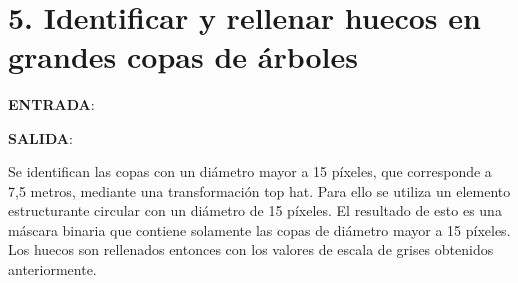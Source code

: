    \begin{center}
    \end{center}
    { \hspace*{\fill} \\}
    
    \hypertarget{identificar-y-rellenar-huecos-en-grandes-copas-de-uxe1rboles}{%
\section{5. Identificar y rellenar huecos en grandes copas de
árboles}\label{identificar-y-rellenar-huecos-en-grandes-copas-de-uxe1rboles}}

\textbf{ENTRADA}:

\textbf{SALIDA}:

Se identifican las copas con un diámetro mayor a 15 píxeles, que
corresponde a 7,5 metros, mediante una transformación top hat. Para ello
se utiliza un elemento estructurante circular con un diámetro de 15
píxeles. El resultado de esto es una máscara binaria que contiene
solamente las copas de diámetro mayor a 15 píxeles. Los huecos son
rellenados entonces con los valores de escala de grises obtenidos
anteriormente.

